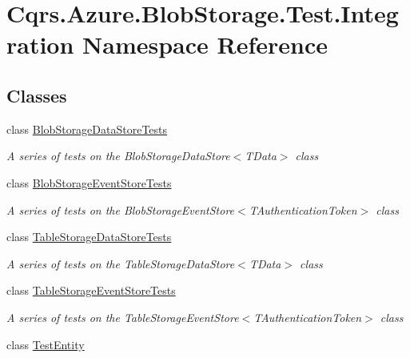 \hypertarget{namespaceCqrs_1_1Azure_1_1BlobStorage_1_1Test_1_1Integration}{}\section{Cqrs.\+Azure.\+Blob\+Storage.\+Test.\+Integration Namespace Reference}
\label{namespaceCqrs_1_1Azure_1_1BlobStorage_1_1Test_1_1Integration}
\subsection*{Classes}
\begin{DoxyCompactItemize}
\item 
class \hyperlink{classCqrs_1_1Azure_1_1BlobStorage_1_1Test_1_1Integration_1_1BlobStorageDataStoreTests}{Blob\+Storage\+Data\+Store\+Tests}
\begin{DoxyCompactList}\small\item\em A series of tests on the Blob\+Storage\+Data\+Store$<$\+T\+Data$>$ class \end{DoxyCompactList}\item 
class \hyperlink{classCqrs_1_1Azure_1_1BlobStorage_1_1Test_1_1Integration_1_1BlobStorageEventStoreTests}{Blob\+Storage\+Event\+Store\+Tests}
\begin{DoxyCompactList}\small\item\em A series of tests on the Blob\+Storage\+Event\+Store$<$\+T\+Authentication\+Token$>$ class \end{DoxyCompactList}\item 
class \hyperlink{classCqrs_1_1Azure_1_1BlobStorage_1_1Test_1_1Integration_1_1TableStorageDataStoreTests}{Table\+Storage\+Data\+Store\+Tests}
\begin{DoxyCompactList}\small\item\em A series of tests on the Table\+Storage\+Data\+Store$<$\+T\+Data$>$ class \end{DoxyCompactList}\item 
class \hyperlink{classCqrs_1_1Azure_1_1BlobStorage_1_1Test_1_1Integration_1_1TableStorageEventStoreTests}{Table\+Storage\+Event\+Store\+Tests}
\begin{DoxyCompactList}\small\item\em A series of tests on the Table\+Storage\+Event\+Store$<$\+T\+Authentication\+Token$>$ class \end{DoxyCompactList}\item 
class \hyperlink{classCqrs_1_1Azure_1_1BlobStorage_1_1Test_1_1Integration_1_1TestEntity}{Test\+Entity}

\end{DoxyCompactItemize}

